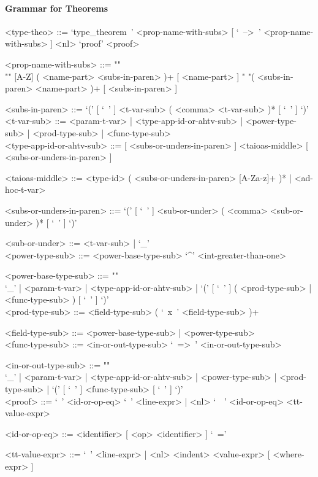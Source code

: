 \documentclass{article}
\begin{document}
\newpage

\paragraph{Grammar for Theorems}

\begin{grammar}
<type-theo> ::=
`type_theorem\ ' <prop-name-with-subs> [ `\ -->\ ' <prop-name-with-subs> ] <nl>
`proof' <proof>

<prop-name-with-subs> ::=  ""\\""
[A-Z] ( <name-part> <subs-in-paren> )+ [ <name-part> ]
\alt " "( <subs-in-paren> <name-part> )+ [ <subs-in-paren> ]

<subs-in-paren> ::=
`(' [ `\ ' ] <t-var-sub> ( <comma> <t-var-sub> )* [ `\ ' ] `)'
\\

<t-var-sub> ::=
<param-t-var> | <type-app-id-or-ahtv-sub> | <power-type-sub> | <prod-type-sub> |
<func-type-sub>
\\

<type-app-id-or-ahtv-sub> ::=
[ <subs-or-unders-in-paren> ] <taioas-middle> [ <subs-or-unders-in-paren> ]

<taioas-middle> ::=
<type-id> ( <subs-or-unders-in-paren> [A-Za-z]+ )* | <ad-hoc-t-var>

<subs-or-unders-in-paren> ::=
`(' [ `\ ' ] <sub-or-under> ( <comma> <sub-or-under> )* [ `\ ' ] `)'

<sub-or-under> ::= <t-var-sub> | `_'
\\

<power-type-sub> ::= <power-base-type-sub> `^' <int-greater-than-one>

<power-base-type-sub> ::= ""\\
`_' | <param-t-var> | <type-app-id-or-ahtv-sub> |
`(' [ `\ ' ] ( <prod-type-sub> | <func-type-sub> ) [ `\ ' ] `)'
\\

<prod-type-sub> ::= <field-type-sub> ( `\ x\ ' <field-type-sub> )+

<field-type-sub> ::= <power-base-type-sub> | <power-type-sub>
\\

<func-type-sub> ::= <in-or-out-type-sub> `\ =>\ ' <in-or-out-type-sub>

<in-or-out-type-sub> ::= ""\\
`_' | <param-t-var> | <type-app-id-or-ahtv-sub> | <power-type-sub> |
<prod-type-sub> | `(' [ `\ ' ] <func-type-sub> [ `\ ' ] `)'
\\

<proof> ::=
`\ ' <id-or-op-eq> `\ ' <line-expr> |
<nl> `\ \ ' <id-or-op-eq>  <tt-value-expr>

<id-or-op-eq> ::= <identifier> [ <op> <identifier> ] `\ ='

<tt-value-expr> ::=
`\ ' <line-expr> | <nl> <indent> <value-expr> [ <where-expr> ]
\end{grammar}
\end{document}
